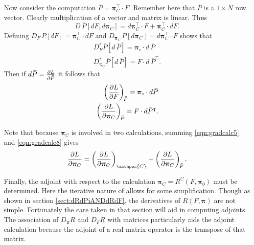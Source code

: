 \begin{calc}[Adjoint \#5]
	Now consider the computation \( \overbar{\!P} = \bm\pi_C^{\intercal}\cdot F \). Remember here that \( \overbar{\!P} \) is a \( 1\times N \) row vector. Clearly multiplication of a vector and matrix is linear. Thus
	\begin{equation}\label{eqn:DYcalc3}
		D\,\overbar{\!P}[dF,d\bm\pi_C] = d\bm\pi_C^{\intercal}\cdot F+\bm\pi_C^{\intercal}\cdot dF.
	\end{equation}
	Defining \( D_F\,\overbar{\!P}[dF] = \bm\pi_C^{\intercal}\cdot dF \) and \( D_{\bm\pi_C}\,\overbar{\!P}[d\bm\pi_C] = d\bm\pi_C^{\intercal}\cdot F \) shows that 
	\begin{align}
		D_F^{\ast}\overbar{\!P}[d\,\overbar{\!P}] = \bm\pi_c\cdot d\,\overbar{\!P}\\
		D_{\bm\pi_C}^{\ast}\overbar{\!P}[d\,\overbar{\!P}] = F\cdot d\,\overbar{\!P}^{\intercal}.
	\end{align}
	Then if \( d\,\overbar{\!P} = \pdv{L}{\,\overbar{\!P}}\) it follows that 
	\begin{align}
	\left(\pdv{L}{F}\right)_{\overbar{\!P}} = \bm\pi_c\cdot d\,\overbar{\!P}\label{eqn:gradcalc7}\\
	\left(\pdv{L}{\bm\pi_C}\right)_{\overbar{\!P}} = F\cdot d\,\overbar{\!P}^{\intercal}\label{eqn:gradcalc8}.
	\end{align}
\end{calc}
Note that because \( \bm\pi_C \) is involved in two calculations, summing \eqref{eqn:gradcalc5} and \eqref{eqn:gradcalc8} gives
\begin{equation}\label{eqn:dLdPIC}
\pdv{L}{\bm\pi_C} = \left(\pdv{L}{\bm\pi_{C}}\right)_{\mathpzc{C}} + \left(\pdv{L}{\bm\pi_C}\right)_{\overbar{\!P}}.
\end{equation}

Finally, the adjoint with respect to the calculation \( \bm\pi_C = R^C(F,\bm\pi_0) \) must be determined.  Here the iterative nature of \DR allows for some simplification. Though as shown in section \ref{sect:dRdPiANDdRdF}, the derivatives of \( R(F,\bm\pi) \) are not simple.  Fortunately the care taken in that section will aid in computing adjoints. The association of \( D_{\bm\pi}R \) and \( D_FR \) with matrices particularly aids the adjoint calculation because the adjoint of a real matrix operator is the transpose of that matrix.

